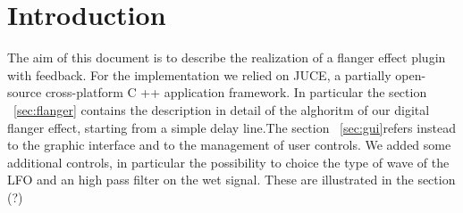 \section{Introduction}

The aim of this document is to describe the realization of a flanger effect plugin with feedback. For the implementation we relied on JUCE, a partially open-source cross-platform C ++ application framework.
In particular the section ~\ref{sec:flanger} contains the description in detail of the alghoritm of our digital flanger effect, starting from a simple delay line.The section ~\ref{sec:gui}refers instead to the graphic interface and to the management of user controls. We added some additional controls, in particular the possibility to choice the type of wave of the LFO and an high pass filter on the wet signal. These are illustrated in the section (?)